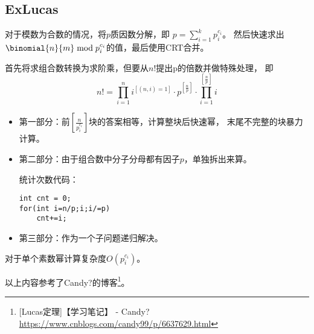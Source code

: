 \subsection{ExLucas}
对于模数为合数的情况，将$p$质因数分解，即
$\displaystyle p=\sum_{i=1}^k{p_i^{c_i}}$。
然后快速求出$\binomial{n}{m} \bmod{p_i^{c_i}}$的值，最后使用CRT合并。

首先将求组合数转换为求阶乘，但要从$n!$提出p的倍数并做特殊处理，
即\begin{displaymath}
	n!=\prod_{i=1}^n{i^{[(n,i)=1]}}\cdot p^{[\frac{n}{p}]}\cdot
	\prod_{i=1}^{[\frac{n}{p}]}i
\end{displaymath}
\begin{itemize}
	\item 第一部分：前$[\frac{n}{p_i^{c_i}}]$块的答案相等，计算整块后快速幂，
	      末尾不完整的块暴力计算。
	\item 第二部分：由于组合数中分子分母都有因子$p$，单独拆出来算。

	统计次数代码：
\begin{lstlisting}
int cnt = 0;
for(int i=n/p;i;i/=p)
	cnt+=i;
\end{lstlisting}
	\item 第三部分：作为一个子问题递归解决。
\end{itemize}
对于单个素数幂计算复杂度$O(p_i^{c_i})$。

以上内容参考了Candy?的博客\footnote{[Lucas定理]【学习笔记】 - Candy?
	\url{https://www.cnblogs.com/candy99/p/6637629.html}}。
